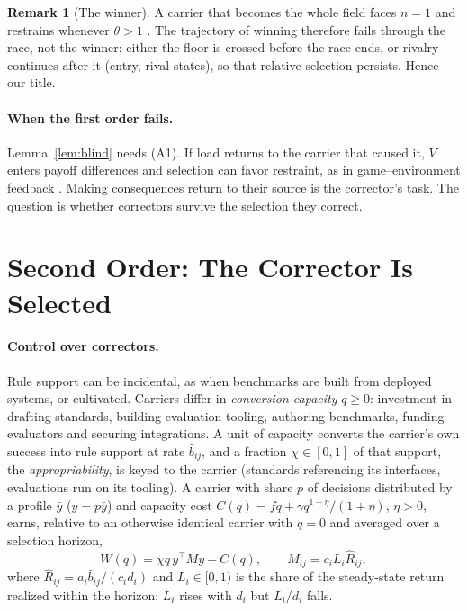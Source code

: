 \documentclass[letterpaper]{article} %
\theoremstyle{definition}
\newtheorem{remark}{Remark}
\begin{document}
\begin{remark}[The winner]\label{rem:winner}
A carrier that becomes the whole field faces $n=1$ and restrains whenever $\theta>1$ \citep{olson1993}. The trajectory of winning therefore fails through the race, not the winner: either the floor is crossed before the race ends, or rivalry continues after it (entry, rival states), so that relative selection persists. Hence our title.
\end{remark}

\paragraph{When the first order fails.} Lemma~\ref{lem:blind} needs (A1). If load returns to the carrier that caused it, $V$ enters payoff differences and selection can favor restraint, as in game--environment feedback \citep{weitz2016,tilman2020}. Making consequences return to their source is the corrector's task. The question is whether correctors survive the selection they correct.

\section{Second Order: The Corrector Is Selected}\label{sec:second}

\paragraph{Control over correctors.} Rule support can be incidental, as when benchmarks are built from deployed systems, or cultivated. Carriers differ in \emph{conversion capacity} $q\ge0$: investment in drafting standards, building evaluation tooling, authoring benchmarks, funding evaluators and securing integrations. A unit of capacity converts the carrier's own success into rule support at rate $\hat b_{ij}$, and a fraction $\chi\in[0,1]$ of that support, the \emph{appropriability}, is keyed to the carrier (standards referencing its interfaces, evaluations run on its tooling). A carrier with share $p$ of decisions distributed by a profile $\bar y$ ($y=p\bar y$) and capacity cost $C(q)=fq+\gamma q^{1+\eta}/(1+\eta)$, $\eta>0$, earns, relative to an otherwise identical carrier with $q=0$ and averaged over a selection horizon,
\begin{equation}\label{eq:W}
W(q)=\chi q\,y^\top My-C(q),\qquad M_{ij}=c_iL_i\hat R_{ij},
\end{equation}
where $\hat R_{ij}=a_i\hat b_{ij}/(c_id_i)$ and $L_i\in[0,1)$ is the share of the steady-state return realized within the horizon; $L_i$ rises with $d_i$ but $L_i/d_i$ falls.
\end{document}
